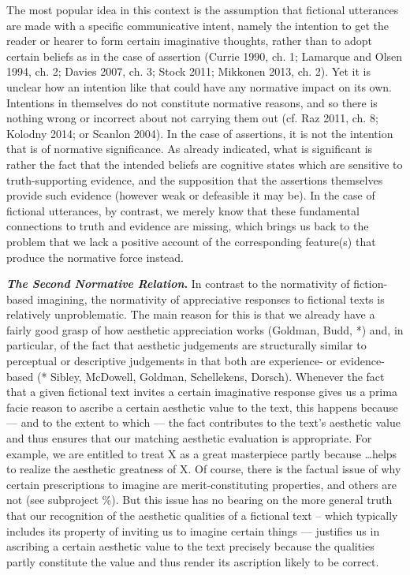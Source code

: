 The most popular idea in this context is the assumption that
fictional utterances are made with a specific communicative intent,
namely the intention to get the reader or hearer to form certain
imaginative thoughts, rather than to adopt certain beliefs as in the
case of assertion (Currie 1990, ch. 1; Lamarque and Olsen 1994, ch. 2;
Davies 2007, ch. 3; Stock 2011; Mikkonen 2013, ch. 2). Yet it is unclear
how an intention like that could have any normative impact on its own.
Intentions in themselves do not constitute normative reasons, and so
there is nothing wrong or incorrect about not carrying them out (cf. Raz
2011, ch. 8; Kolodny 2014; or Scanlon 2004). In the case of assertions,
it is not the intention that is of normative significance. As already
indicated, what is significant is rather the fact that the intended
beliefs are cognitive states which are sensitive to truth-supporting
evidence, and the supposition that the assertions themselves provide
such evidence (however weak or defeasible it may be). In the case of
fictional utterances, by contrast, we merely know that these fundamental
connections to truth and evidence are missing, which brings us back to
the problem that we lack a positive account of the corresponding
feature(s) that produce the normative force instead.

\vspace{.2cm}
\noindent\textbf{\emph{The Second Normative Relation}.} In contrast to the
normativity of fiction-based imagining, the normativity of appreciative
responses to fictional texts is relatively unproblematic. The main
reason for this is that we already have a fairly good grasp of how
aesthetic appreciation works (Goldman, Budd, *) and, in particular, of
the fact that aesthetic judgements are structurally similar to
perceptual or descriptive judgements in that both are experience- or
evidence-based (* Sibley, McDowell, Goldman, Schellekens, Dorsch).
Whenever the fact that a given fictional text invites a certain
imaginative response gives us a prima facie reason to ascribe a certain
aesthetic value to the text, this happens because --- and to the extent
to which --- the fact contributes to the text's aesthetic value and thus
ensures that our matching aesthetic evaluation is appropriate. For
example, we are entitled to treat X as a great masterpiece partly
because \ldots helps to realize the aesthetic greatness of X. Of
course, there is the factual issue of why certain prescriptions to
imagine are merit-constituting properties, and others are not (see
subproject \%). But this issue has no bearing on the more general truth
that our recognition of the aesthetic qualities of a fictional text --
which typically includes its property of inviting us to imagine certain
things --- justifies us in ascribing a certain aesthetic value to the
text precisely because the qualities partly constitute the value and
thus render its ascription likely to be correct.

